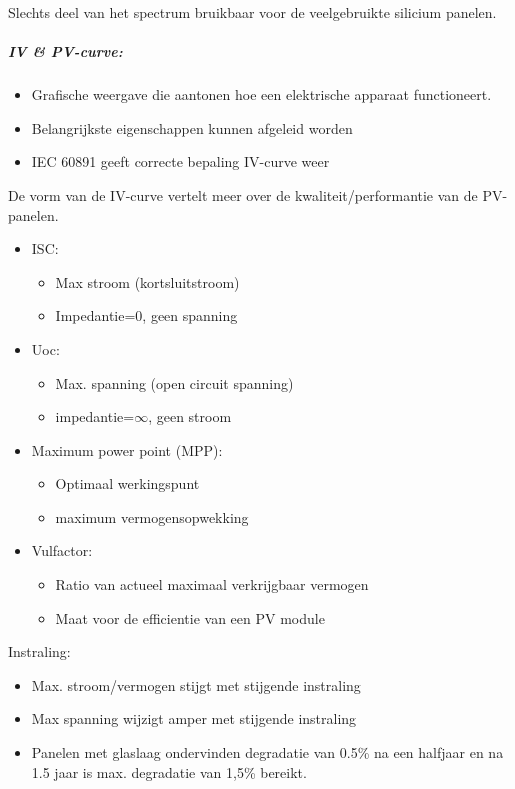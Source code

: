 \documentclass[12pt]{article}
\begin{document}
Slechts deel van het spectrum bruikbaar voor de veelgebruikte silicium panelen.
\subparagraph{IV \& PV-curve:}
\begin{itemize}
    \item Grafische weergave die aantonen hoe een elektrische apparaat functioneert.
    \item Belangrijkste eigenschappen kunnen afgeleid worden 
    \item IEC 60891 geeft correcte bepaling IV-curve weer
\end{itemize}
De vorm van de IV-curve vertelt meer over de kwaliteit/performantie van de PV-panelen.
\begin{itemize}
    \item ISC:\begin{itemize}
        \item Max stroom (kortsluitstroom)
        \item Impedantie=0, geen spanning 
    \end{itemize}
    \item Uoc:\begin{itemize}
        \item Max. spanning (open circuit spanning)
        \item impedantie=$\infty$, geen stroom
    \end{itemize}
    \item Maximum power point (MPP):\begin{itemize}
        \item Optimaal werkingspunt 
        \item maximum vermogensopwekking
    \end{itemize}
    \item Vulfactor:\begin{itemize}
        \item Ratio van actueel maximaal verkrijgbaar vermogen 
        \item Maat voor de efficientie van een PV module
    \end{itemize}
\end{itemize}
Instraling:\begin{itemize}
    \item Max. stroom/vermogen stijgt met stijgende instraling
    \item Max spanning wijzigt amper met stijgende instraling 
    \item Panelen met glaslaag ondervinden degradatie van 0.5\% na een halfjaar en na 1.5 jaar is max. degradatie van 1,5\% bereikt.
\end{itemize}
\end{document}
